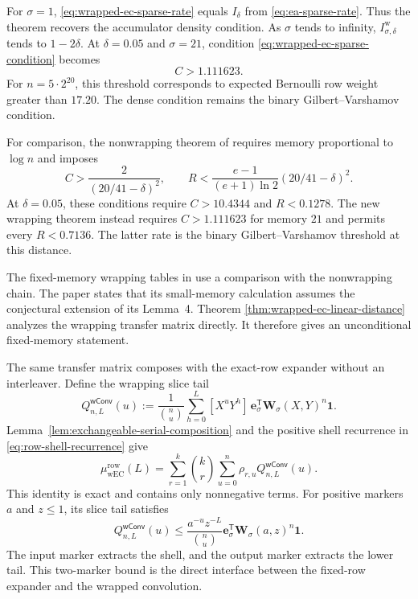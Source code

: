 For $\sigma=1$, \eqref{eq:wrapped-ec-sparse-rate} equals $I_\delta$ from
\eqref{eq:ea-sparse-rate}.  Thus the theorem recovers the accumulator density
condition.  As $\sigma$ tends to infinity,
$I^{\mathrm{w}}_{\sigma,\delta}$ tends to $1-2\delta$.  At
$\delta=0.05$ and $\sigma=21$, condition
\eqref{eq:wrapped-ec-sparse-condition} becomes
\begin{equation}
 C>1.111623.
 \label{eq:wrapped-ec-delta-five-density}
\end{equation}
For $n=5\mathbin{\cdot}2^{20}$, this threshold corresponds to expected
Bernoulli row weight greater than $17.20$.  The dense condition remains the
binary Gilbert--Varshamov condition.

For comparison, the nonwrapping theorem of
\cite[Theorem~3]{EC} requires memory proportional to $\log n$ and imposes
\begin{equation}
 C>\frac{2}{(20/41-\delta)^2},
 \qquad
 R<
 \frac{e-1}{(e+1)\ln2}(20/41-\delta)^2.
 \label{eq:wrapped-ec-prior-asymptotic-conditions}
\end{equation}
At $\delta=0.05$, these conditions require $C>10.4344$ and $R<0.1278$.
The new wrapping theorem instead requires $C>1.111623$ for memory $21$ and
permits every $R<0.7136$.  The latter rate is the binary
Gilbert--Varshamov threshold at this distance.

The fixed-memory wrapping tables in \cite[Appendix~A.1]{EC} use a comparison
with the nonwrapping chain.  The paper states that its small-memory calculation
assumes the conjectural extension of its Lemma~4.  Theorem
\ref{thm:wrapped-ec-linear-distance} analyzes the wrapping transfer matrix
directly.  It therefore gives an unconditional fixed-memory statement.

The same transfer matrix composes with the exact-row expander without an
interleaver.  Define the wrapping slice tail
\begin{equation}
 Q^{\textsf{wConv}}_{n,L}(u)
 :=\frac{1}{\binom{n}{u}}
   \sum_{h=0}^{L}[X^uY^h]\,
   \mathbf e_\sigma^\mathsf{T}
   \mathbf W_\sigma(X,Y)^n\mathbf 1.
 \label{eq:wrapping-slice-tail}
\end{equation}
Lemma~\ref{lem:exchangeable-serial-composition} and the positive shell
recurrence in \eqref{eq:row-shell-recurrence} give
\begin{equation}
 \boxed{
 \mu_{\mathrm{wEC}}^{\mathrm{row}}(L)
 =\sum_{r=1}^{k}\binom{k}{r}
   \sum_{u=0}^{n}\rho_{r,u}
   Q^{\textsf{wConv}}_{n,L}(u).
 }
 \label{eq:row-wrapped-expand-convolute-first-moment}
\end{equation}
This identity is exact and contains only nonnegative terms.  For positive
markers $a$ and $z\leq1$, its slice tail satisfies
\begin{equation}
 Q^{\textsf{wConv}}_{n,L}(u)
 \leq
 \frac{a^{-u}z^{-L}}{\binom{n}{u}}
 \mathbf e_\sigma^\mathsf{T}
 \mathbf W_\sigma(a,z)^n\mathbf 1.
 \label{eq:wrapping-slice-chernoff}
\end{equation}
The input marker extracts the shell, and the output marker extracts the lower
tail.  This two-marker bound is the direct interface between the fixed-row
expander and the wrapped convolution.

